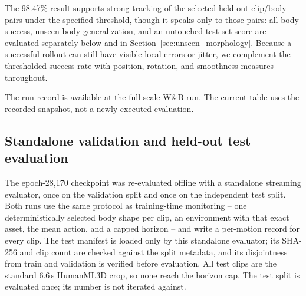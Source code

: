 The 98.47\% result supports strong tracking of the selected held-out
clip/body pairs under the specified threshold, though it speaks only to
those pairs: all-body success, unseen-body generalization, and an untouched
test-set score are evaluated separately below and in
Section~\ref{sec:unseen_morphology}. Because a successful rollout can still
have visible local errors or jitter, we complement the thresholded success
rate with position, rotation, and smoothness measures throughout.

The run record is available at
\href{https://wandb.ai/yugoamaryl/hhi-protomotions/runs/3mvgad6f}
{the full-scale W\&B run}. The current table uses the recorded snapshot,
not a newly executed evaluation.

\subsection{Standalone validation and held-out test evaluation}\label{sec:test_results}

The epoch-28,170 checkpoint was re-evaluated offline with a standalone
streaming evaluator, once on the validation split and once on the
independent test split. Both runs use the same protocol as training-time
monitoring -- one deterministically selected body shape per clip, an
environment with that exact asset, the mean action, and a capped horizon --
and write a per-motion record for every clip. The test manifest is loaded
only by this standalone evaluator; its SHA-256 and clip count are checked
against the split metadata, and its disjointness from train and validation is
verified before evaluation. All test clips are the standard 6.6\,s HumanML3D
crop, so none reach the horizon cap. The test split is evaluated once; its
number is not iterated against.

